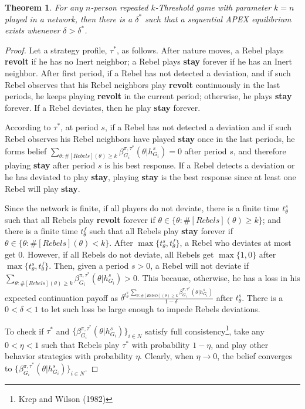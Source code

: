 \documentclass[12pt,letter]{article}
\newtheorem{theorem}{Theorem}
\theoremstyle{definition}
\theoremstyle{remark}
\theoremstyle{claim}
\begin{document}
\begin{theorem}
\label{prop:not_crowded}
For any $n$-person repeated $k$-Threshold game with parameter $k=n$ played in a network, then there is a $\delta^{*}$ such that a sequential APEX equilibrium exists whenever $\delta>
\delta^{*}$.
\end{theorem}
\begin{proof}
Let a strategy profile, $\tau^{*}$, as follows. After nature moves, a Rebel plays \textbf{revolt} if he has no Inert neighbor; a Rebel plays \textbf{stay} forever if he has an Inert neighbor. After first period, if a Rebel has not detected a deviation, and if such Rebel observes that his Rebel neighbors play \textbf{revolt} continuously in the last periods, he keeps playing \textbf{revolt} in the current period; otherwise, he plays \textbf{stay} forever. If a Rebel deviates, then he play \textbf{stay} forever.

According to $\tau^{*}$, at period $s$, if a Rebel has not detected a deviation and if such Rebel observes his Rebel neighbors have played \textbf{stay} once in the last periods, he forms belief $\sum_{\theta:\#[Rebels](\theta)\geq k}\beta^{\pi,\tau^*}_{G_i}(\theta|h^{s}_{G_i})=0$ after period $s$, and therefore playing \textbf{stay} after period $s$ is his best response. If a Rebel detects a deviation or he has deviated to play \textbf{stay}, playing \textbf{stay} is the best response since at least one Rebel will play \textbf{stay}. 

Since the network is finite, if all players do not deviate, there is a finite time $t^{s}_{\theta}$ such that all Rebels play \textbf{revolt} forever if $\theta\in \{\theta: \#[Rebels](\theta)\geq k\}$; and there is a finite time $t^f_{\theta}$ such that all Rebels play \textbf{stay} forever if $\theta\in \{\theta: \#[Rebels](\theta)< k\}$. After $\max\{t^{s}_{\theta},t^f_{\theta}\}$, a Rebel who deviates at most get 0. However, if all Rebels do not deviate, all Rebels get $\max\{1,0\}$ after $\max\{t^{s}_{\theta},t^f_{\theta}\}$. Then, given a period $s>0$, a Rebel will not deviate if $\sum_{\theta:\#[Rebels](\theta)\geq k}\beta^{\pi,\tau^*}_{G_i}(\theta|h^{s}_{G_i})>0$. This because, otherwise, he has a loss in his expected continuation payoff as $\delta^{t^s_{\theta}}\frac{\sum_{\theta:\#[Rebels](\theta)\geq k}\beta^{\pi,\tau^*}_{G_i}(\theta|h^{s}_{G_i})}{1-\delta}$ after $t^s_{\theta}$. There is a $0<\delta<1$ to let such loss be large enough to impede Rebels deviations.

To check if $\tau^{*}$ and $\{\beta^{\pi,\tau^*}_{G_i}(\theta|h^{s}_{G_i})\}_{i\in N}$ satisfy full consistency\footnote{Krep and Wilson (1982)}, take any $0<\eta<1$ such that Rebels play $\tau^{*}$ with probability $1-\eta$, and play other behavior strategies with probability $\eta$. Clearly, when $\eta \rightarrow 0$, the belief converges to $\{\beta^{\pi,\tau^*}_{G_i}(\theta|h^{s}_{G_i})\}_{i\in N}$.
\end{proof}
\end{document}
